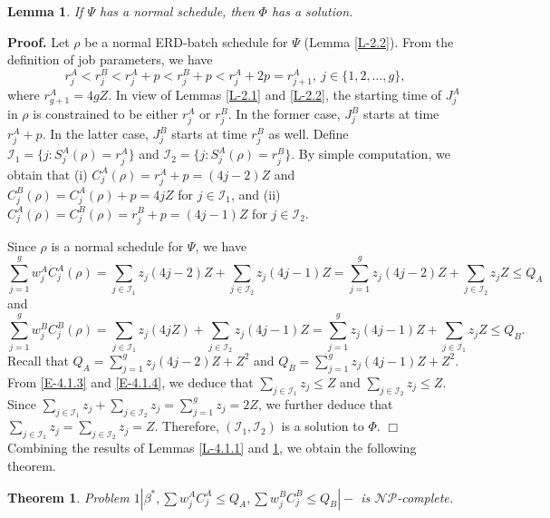 \documentclass[12pt]{article}
\newtheorem{theorem}{Theorem}[section]
\newtheorem{lemma}{Lemma}[section]
\begin{document}
\begin{sloppypar}
\begin{lemma} \label{L-4.1.2}
If $\Psi$ has a normal schedule, then $\Phi$ has a solution.
\end{lemma}
\noindent \textbf{Proof.} Let $\rho$ be a normal ERD-batch schedule for $\Psi$ (Lemma \ref{L-2.2}).
From the definition of job parameters, we have
\begin{equation*}\label{E-4.1.1}
r_j^A <r_j^B<r_j^A+p<r_j^B+p<r_j^A+2p = r_{j+1}^A, ~ j \in \{1, 2, \ldots, g\},
\end{equation*}
where $r_{g+1}^A=4gZ$. In view of Lemmas \ref{L-2.1} and \ref{L-2.2}, the starting time of $J_j^A$ in $\rho$ is constrained to be either $r_j^A$ or $r_j^B$. In the former case, $J_j^B$ starts at time $r_j^A+p$. In the latter case, $J_j^B$ starts at time $r_j^B$ as well. Define $\mathcal{I}_1=\{j: S_j^A(\rho)=r_j^A\}$
and $\mathcal{I}_2=\{j: S_j^A(\rho)=r_j^B\}$. By simple computation, we obtain that (i)
$C_j^A(\rho)=r_j^A+p=(4j-2) Z$ and $C_j^B(\rho)=C_j^A(\rho)+p=4jZ$ for $j \in \mathcal{I}_1$,
and (ii) $C_j^A(\rho)=C_j^B(\rho)=r_j^B+p=(4j-1)Z$ for $j \in \mathcal{I}_2$.

Since $\rho$ is a normal schedule for $\Psi$, we have
\begin{equation} \label{E-4.1.3}
\sum_{j=1}^g w_j^A C_j^A(\rho)=\sum_{j \in \mathcal{I}_1} z_j (4j-2)Z+\sum_{j \in \mathcal{I}_2} z_j (4j-1)Z
=\sum_{j=1}^g z_j (4j-2)Z+\sum_{j \in \mathcal{I}_2} z_j Z \leq Q_A
\end{equation}
and
\begin{equation}\label{E-4.1.4}
\sum_{j=1}^g w_j^B C_j^B(\rho)=\sum_{j \in \mathcal{I}_1} z_j (4jZ)+\sum_{j \in \mathcal{I}_2} z_j (4j-1)Z
=\sum_{j=1}^g z_j (4j-1)Z+\sum_{j \in \mathcal{I}_1} z_j Z \leq Q_B.
\end{equation}
Recall that $Q_A=\sum_{j=1}^g z_j(4j-2)Z + Z^2$ and $Q_B=\sum_{j=1}^g z_j(4j-1)Z + Z^2$.
From \eqref{E-4.1.3} and \eqref{E-4.1.4}, we deduce that
$\sum_{j \in \mathcal{I}_1} z_j \leq Z$ and $\sum_{j \in \mathcal{I}_2} z_j \leq Z$.
Since $\sum_{j \in \mathcal{I}_1}z_j +\sum_{j \in \mathcal{I}_2} z_j = \sum_{j=1}^g z_j =2Z$, we further deduce that $\sum_{j \in \mathcal{I}_1} z_j= \sum_{j \in \mathcal{I}_2} z_j=Z$.
Therefore, $(\mathcal{I}_1, \mathcal{I}_2)$ is a solution to $\Phi$. \hfill$\Box$\\

Combining the results of Lemmas \ref{L-4.1.1} and \ref{L-4.1.2}, we obtain the following theorem.

\begin{theorem} \label{T-4.1}
Problem $1 | \beta^{*}, \sum w_j^A C_j^A \leq Q_A, \sum w_j^B C_j^B \leq Q_B|-$ is $\mathcal{NP}$-complete.
\end{theorem}


\end{sloppypar}
\end{document}
